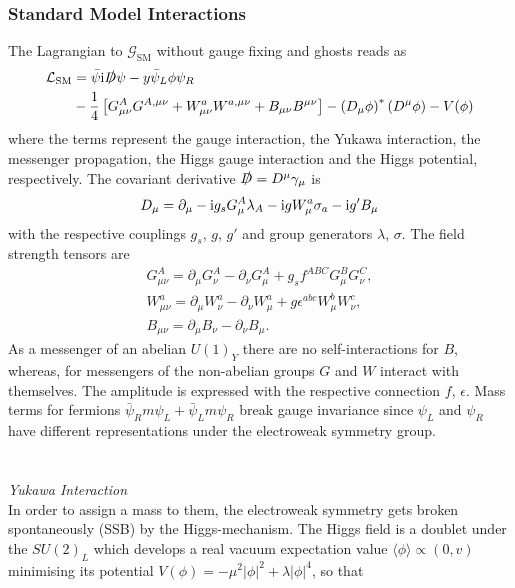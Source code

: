 \subsubsection{Standard Model Interactions}
The Lagrangian to $\mathcal{G}_\text{SM}$ without gauge fixing and ghosts reads as
\begin{align}
 \mathcal{L}_\text{SM} &= \bar \psi \text{i} \slashed{D}\psi -y\bar\psi_L\phi\psi_R \nonumber\\
 &- \frac14\left[G^A_{\mu\nu}G^{A,\mu\nu} + W^a_{\mu\nu}W^{a,\mu\nu} + B_{\mu\nu}B^{\mu\nu}\right] - \left(D_\mu\phi\right)^*\left(D^\mu\phi\right) - V(\phi)    
 \label{eq_smlagrange}
\end{align}
where the terms represent the gauge interaction, the Yukawa interaction, the messenger propagation, the Higgs gauge interaction and
the Higgs potential, respectively. The covariant derivative $\slashed{D}=D^\mu\gamma_\mu$ is
\begin{align}
 D_\mu = \partial_\mu -\text{i} g_s G^A_\mu \lambda_A - \text{i} g W^a_\mu\sigma_a - \text{i} g'B_\mu
\end{align}
with the respective couplings $g_s$, $g$, $g'$ and group generators $\lambda$, $\sigma$. The field strength tensors are
\begin{align}
 G^A_{\mu\nu} = \partial_\mu G^A_\nu - \partial_\nu G^A_\mu + g_s f^{ABC}G^B_\mu G^C_\nu,\\
 W^a_{\mu\nu} = \partial_\mu W^a_\nu - \partial_\nu W^a_\mu + g \epsilon^{abc}W^b_\mu W^c_\nu,\\
 B_{\mu\nu} = \partial_\mu B_\nu - \partial_\nu B_\mu.
\end{align}
As a messenger of an abelian $U(1)_Y$ there are no self-interactions for $B$, whereas, for messengers of the non-abelian groups $G$ and $W$ interact 
with themselves. The amplitude is expressed with the respective connection $f$, $\epsilon$. Mass terms for fermions $\bar\psi_R m\psi_L + \bar\psi_L m\psi_R$ 
break gauge invariance since $\psi_L$ and $\psi_R$ have different representations under the electroweak symmetry group. 
\\\\ \\ \textit{Yukawa Interaction} \\
\noindent In order to assign a 
mass to them, the electroweak symmetry gets broken spontaneously (SSB) by the Higgs-mechanism. The Higgs field is a doublet under the $SU(2)_L$ which 
develops 
a real vacuum expectation value $\langle \phi\rangle \propto (0,v)$ minimising its potential $V(\phi)=-\mu^2|\phi|^2+\lambda|\phi|^4$, so that
